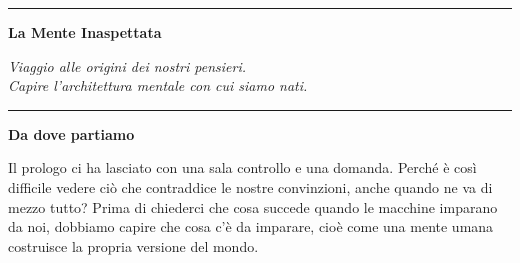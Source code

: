 

\cleardoublepage
\thispagestyle{empty}

\vspace*{\fill}

\begin{center}
    {\sffamily\huge{}}
    
    \vspace{1.5em}
    
    \rule{0.5\textwidth}{0.4pt}
    
    \vspace{1.5em}
    
    {\sffamily\Huge\bfseries La Mente Inaspettata}
    
    \vspace{2em}
    
    \begin{minipage}{0.7\textwidth}
        \centering
        {\large\itshape\color{moderngray}
        Viaggio alle origini dei nostri pensieri.\\
        Capire l'architettura mentale con cui siamo nati.}
    \end{minipage}
    
    \vspace{1.5em}
    
    \rule{0.5\textwidth}{0.4pt}
\end{center}

\vspace*{\fill}

\clearpage
\thispagestyle{empty}
\vspace*{2em}
\begin{center}
	{\sffamily\large\bfseries\color{darkgray} Da dove partiamo}
\end{center}
\vspace{1em}

Il prologo ci ha lasciato con una sala controllo e una domanda. Perché è così difficile vedere ciò che contraddice le nostre convinzioni, anche quando ne va di mezzo tutto? Prima di chiederci che cosa succede quando le macchine imparano da noi, dobbiamo capire che cosa c'è da imparare, cioè come una mente umana costruisce la propria versione del mondo.

